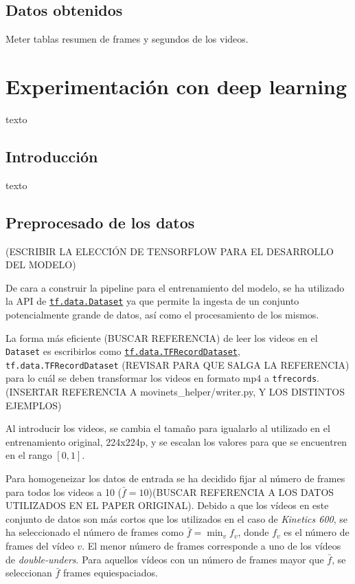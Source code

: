 \subsection{Datos obtenidos}

Meter tablas resumen de frames y segundos de los videos.


\section{Experimentación con deep learning}

texto

\subsection{Introducción}

texto

\subsection{Preprocesado de los datos}

(ESCRIBIR LA ELECCIÓN DE TENSORFLOW PARA EL DESARROLLO DEL MODELO)

De cara a construir la pipeline para el entrenamiento del modelo, se ha utilizado la API de \href{https://www.tensorflow.org/api_docs/python/tf/data/Dataset}{\texttt{tf.data.Dataset}} ya que permite la ingesta de un conjunto potencialmente grande de datos, así como el procesamiento de los mismos.

La forma más eficiente (BUSCAR REFERENCIA) de leer los videos en el \texttt{Dataset} es escribirlos como \href{https://www.tensorflow.org/api_docs/python/tf/data/TFRecordDataset}{\texttt{tf.data.TFRecordDataset}}, 
\texttt{tf.data.TFRecordDataset}
(REVISAR PARA QUE SALGA LA REFERENCIA)
para lo cuál se deben transformar los videos en formato mp4 a \texttt{tfrecords}. (INSERTAR REFERENCIA A movinets\_helper/writer.py, Y LOS DISTINTOS EJEMPLOS)

Al introducir los videos, se cambia el tamaño para igualarlo al utilizado en el entrenamiento original, 224x224p, y se escalan los valores para que se encuentren en el rango $[0, 1]$.

Para homogeneizar los datos de entrada se ha decidido fijar al número de frames para todos los videos a 10 ($\bar{f}=10$)(BUSCAR REFERENCIA A LOS DATOS UTILIZADOS EN EL PAPER ORIGINAL). Debido a que los vídeos en este conjunto de datos son más cortos que los utilizados en el caso de \textit{Kinetics 600}, se ha seleccionado el número de frames como $\bar{f} = \min_v f_{v}$, donde $f_v$ es el número de frames del vídeo $v$. El menor número de frames corresponde a uno de los vídeos de \textit{double-unders}. Para aquellos vídeos con un número de frames mayor que $\bar{f}$, se seleccionan $\bar{f}$ frames equiespaciados.


